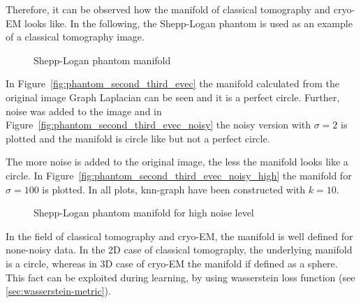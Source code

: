 Therefore, it can be observed how the manifold of classical tomography and cryo-EM looks like.
In the following, the Shepp-Logan phantom is used as an example of a classical tomography image.

\begin{figure}[H]
    \centering
    \caption{Shepp-Logan phantom manifold}
\end{figure}

In Figure~\ref{fig:phantom_second_third_evec} the manifold calculated from the original image Graph Laplacian
can be seen and it is a perfect circle. 
Further, noise was added to the image and in Figure~\ref{fig:phantom_second_third_evec_noisy}
the noisy version with $\sigma=2$ is plotted and the manifold is circle like but not a perfect circle.

The more noise is added to the original image, the less the manifold looks like a circle. In Figure~\ref{fig:phantom_second_third_evec_noisy_high}
the manifold for $\sigma=100$ is plotted. In all plots, knn-graph have been constructed with $k=10$. 

\begin{figure}[H]
    \centering
    \caption{Shepp-Logan phantom manifold for high noise level}
\end{figure}


\begin{tcolorbox}[colback=red!5!white,colframe=red!75!black]
    In the field of classical tomography and cryo-EM, the manifold is well defined for none-noisy data.
    In the 2D case of classical tomography, the underlying manifold is a circle, whereas in 3D case of cryo-EM the manifold
    if defined as a sphere.
    This fact can be exploited during learning, by using wasserstein loss function (see \ref{sec:wasserstein-metric}).
\end{tcolorbox}



